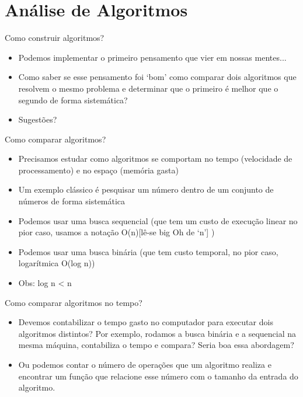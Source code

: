 \section{Análise de Algoritmos}

\begin{frame}
\begin{block}{Como construir algoritmos?}
	\begin{itemize}
		\item Podemos implementar o primeiro pensamento que vier em nossas mentes...
		
		\item Como saber se esse pensamento foi ‘bom’ como comparar dois algoritmos que resolvem o mesmo problema e determinar que o primeiro é melhor que o segundo de forma sistemática?
		
		\item Sugestões?
	\end{itemize}
\end{block}
\end{frame}


\begin{frame}
\begin{block}{Como comparar algoritmos?}
	\begin{itemize}
		\item Precisamos estudar como algoritmos se comportam no tempo (velocidade de processamento) e no espaço (memória gasta)

		\item Um exemplo clássico é pesquisar um número dentro de um conjunto de números de forma sistemática
		
		\item Podemos usar uma busca sequencial (que tem um custo de execução linear no pior caso, usamos a notação O(n)[lê-se big Oh de ‘n’] )
		
		\item Podemos usar uma busca binária (que tem custo temporal, no pior caso, logarítmica O(log n))
		
		\item Obs: log n < n
	\end{itemize}
\end{block}
\end{frame}

\begin{frame}
\begin{block}{Como comparar algoritmos no tempo?}
	\begin{itemize}
		\item Devemos contabilizar o tempo gasto no computador para executar dois algoritmos distintos? Por exemplo, rodamos a busca binária e a sequencial na mesma máquina, contabiliza o tempo e compara? Seria boa essa abordagem?

		\item Ou podemos contar o número de operações que um algoritmo realiza e encontrar um função que relacione esse número com o tamanho da entrada do algoritmo.
		
	\end{itemize}
\end{block}
\end{frame}


